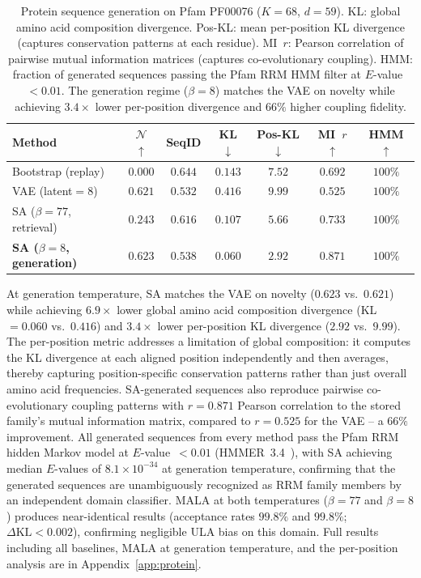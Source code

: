 \begin{table}[t]
\centering
\caption{Protein sequence generation on Pfam PF00076 ($K{=}68$, $d{=}59$). KL: global amino acid composition divergence. Pos-KL: mean per-position KL divergence (captures conservation patterns at each residue). MI~$r$: Pearson correlation of pairwise mutual information matrices (captures co-evolutionary coupling). HMM: fraction of generated sequences passing the Pfam RRM HMM filter at $E$-value~$<0.01$. The generation regime ($\beta{=}8$) matches the VAE on novelty while achieving $3.4{\times}$ lower per-position divergence and $66\%$ higher coupling fidelity.}
\label{tab:protein-main}
\small
\begin{tabular}{@{}lcccccc@{}}
\toprule
Method & $\mathcal{N}$ $\uparrow$ & SeqID & KL $\downarrow$ & Pos-KL $\downarrow$ & MI~$r$ $\uparrow$ & HMM $\uparrow$ \\
\midrule
Bootstrap (replay)                  & $0.000$ & $0.644$ & $0.143$ & $7.52$ & $0.692$ & $100\%$ \\
VAE (latent${=}8$)                  & $0.621$ & $0.532$ & $0.416$ & $9.99$ & $0.525$ & $100\%$ \\
SA ($\beta{=}77$, retrieval)        & $0.243$ & $0.616$ & $0.107$ & $5.66$ & $0.733$ & $100\%$ \\
\textbf{SA ($\beta{=}8$, generation)} & $\mathbf{0.623}$ & $0.538$ & $\mathbf{0.060}$ & $\mathbf{2.92}$ & $\mathbf{0.871}$ & $100\%$ \\
\bottomrule
\end{tabular}
\end{table}

At generation temperature, SA matches the VAE on novelty ($0.623$ vs.\ $0.621$) while achieving $6.9{\times}$ lower global amino acid composition divergence (KL$=0.060$ vs.\ $0.416$) and $3.4{\times}$ lower per-position KL divergence ($2.92$ vs.\ $9.99$). The per-position metric addresses a limitation of global composition: it computes the KL divergence at each aligned position independently and then averages, thereby capturing position-specific conservation patterns rather than just overall amino acid frequencies. SA-generated sequences also reproduce pairwise co-evolutionary coupling patterns with $r{=}0.871$ Pearson correlation to the stored family's mutual information matrix, compared to $r{=}0.525$ for the VAE -- a $66\%$ improvement. All generated sequences from every method pass the Pfam RRM hidden Markov model at $E$-value~$<0.01$ (HMMER~3.4~\cite{hmmer3}), with SA achieving median $E$-values of $8.1{\times}10^{-34}$ at generation temperature, confirming that the generated sequences are unambiguously recognized as RRM family members by an independent domain classifier. MALA at both temperatures ($\beta{=}77$ and $\beta{=}8$) produces near-identical results (acceptance rates $99.8\%$ and $99.8\%$; $\Delta\mathrm{KL}<0.002$), confirming negligible ULA bias on this domain. Full results including all baselines, MALA at generation temperature, and the per-position analysis are in Appendix~\ref{app:protein}.

